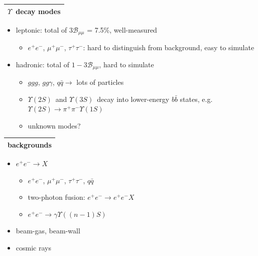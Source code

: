 \documentclass[landscape]{article}
\newcommand{\ups}{$\Upsilon$}
\newcommand{\uss}{$\Upsilon(2S)$}
\newcommand{\usss}{$\Upsilon(3S)$}
\newcommand{\ee}{$e^+e^-$}
\newcommand{\mumu}{$\mu^+\mu^-$}
\newcommand{\tautau}{$\tau^+\tau^-$}
\newcommand{\qqbar}{$q\bar{q}$}
\newcommand{\twotoone}{$\Upsilon(2S) \to \pi^+\pi^- \Upsilon(1S)$}
\begin{document}
\begin{slide:technique}

\begin{tabular}{l}
\ups\ decay modes \\\hline
\end{tabular}

\begin{itemize}

  \item leptonic: total of $3{\mathcal B}_{\mu\mu}$ = 7.5\%, well-measured

  \begin{itemize}

    \item \ee, \mumu, \tautau: hard to distinguish from background, easy to simulate

  \end{itemize}

  \item hadronic: total of $1 - 3{\mathcal B}_{\mu\mu}$, hard to simulate

  \begin{itemize}\setlength{\itemsep}{0.25 cm}

    \item $ggg$, $gg\gamma$, $q\bar{q} \to$ lots of particles

    \item \uss\ and \usss\ decay into lower-energy $b\bar{b}$ states, e.g.\ \twotoone

    \item unknown modes?

  \end{itemize}

\end{itemize}

\vfill
\begin{tabular}{l}
backgrounds \\\hline
\end{tabular}

\begin{itemize}

  \item $e^+e^- \to X$

  \begin{itemize}\setlength{\itemsep}{0.25 cm}

    \item \ee, \mumu, \tautau, \qqbar

    \item two-photon fusion: $e^+e^- \to e^+e^- X$

    \item $e^+e^- \to \gamma \Upsilon((n-1)S)$

  \end{itemize}

  \item beam-gas, beam-wall

  \item cosmic rays

\end{itemize}

\vspace{-1.5 cm}

\end{slide:technique}
\end{document}
